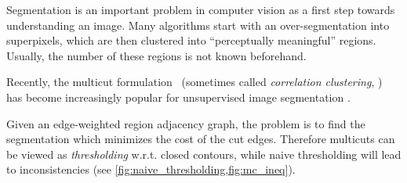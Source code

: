 Segmentation is an important problem in computer vision as a first step
towards understanding an image. Many algorithms start with an over-segmentation
into superpixels, which are then clustered into ``perceptually meaningful''
regions.
Usually, the number of these regions is not known beforehand.

Recently, the multicut formulation~\cite{chopra_1993_mp} 
(sometimes called \emph{correlation clustering}, \cite{bansal_2004_ml}) 
has become increasingly popular for unsupervised
image segmentation \cite{andres_2011_iccv,yarkony_2012_eccv,alush_2013_simbad}.


Given an edge-weighted region adjacency graph,
the problem is to find the segmentation which
minimizes the cost of the cut edges.
Therefore multicuts can be viewed as \emph{thresholding} w.r.t. closed contours, while
naive thresholding will lead to inconsistencies 
(see \cref{fig:naive_thresholding,fig:mc_ineq}).


